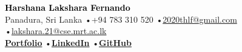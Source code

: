 \begin{center}
    {\fontsize{20}{24}\bfseries \textcolor{black}{Harshana Lakshara Fernando}}\\[4pt]
    {\fontsize{9}{11}\selectfont
    Panadura, Sri Lanka \enspace•\enspace +94 783 310 520 \enspace•\enspace \href{mailto:2020thlf@gmail.com}{\color{black}2020thlf@gmail.com} \enspace•\enspace \href{mailto:lakshara.21@cse.mrt.ac.lk}{\color{black}lakshara.21@cse.mrt.ac.lk}\\[3pt]
    \href{https://harshanalf.netlify.app}{\textbf{\color{black}Portfolio}} \enspace•\enspace \href{https://www.linkedin.com/in/harshana-lakshara/}{\textbf{\color{black}LinkedIn}} \enspace•\enspace \href{https://github.com/UchihaIthachi}{\textbf{\color{black}GitHub}}
    }
\end{center}
\vspace{-0.4em}

\vspace{0em} %
